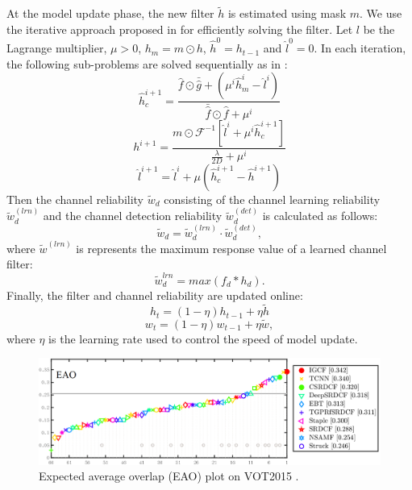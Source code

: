 At the model update phase, the new filter $\tilde{h}$ is estimated using mask $m$. We use the iterative approach proposed in \cite{Lukezic2017DiscriminativeCF} for efficiently solving the filter. Let $l$ be the Lagrange multiplier, $\mu > 0$, $h_m=m \odot h$, $\hat{h}^0 = h_{t-1}$ and $\hat{l}^0 = 0$. In each iteration, the following sub-problems are solved sequentially as in \cite{Lukezic2017DiscriminativeCF}:
\begin{equation} \label{eq:h1}
\hat{h}_c^{i+1} = \frac{\hat{f} \odot \bar{\hat{g}} +(\mu^i \hat{h}_m^i - \hat{l}^i)}{\bar{\hat{f}} \odot \hat f + \mu^i}
\end{equation}
\begin{equation}
h^{i+1} = \frac{m \odot \mathcal{F}^{-1}[\hat{l}^i + \mu^i\hat{h}_c^{i+1}]}{\frac{\lambda}{2D} + \mu^i}
\end{equation}
\begin{equation} \label{eq:h3}
\hat{l}^{i+1} = \hat{l}^i + \mu(\hat{h}_c^{i+1} - \hat{h}^{i+1})
\end{equation}
Then the channel reliability $\tilde w_d$ \cite{Lukezic2017DiscriminativeCF} consisting of the channel learning reliability $\tilde w_d^{(lrn)}$ and the channel detection reliability $\tilde w_d^{(det)}$ is calculated as follows: 
\begin{equation} \label{eq:c}
\tilde w_d = \tilde w_d^{(lrn)} \cdot \tilde w_d^{(det)},
\end{equation}
where $\tilde{w}^{(lrn)}$ is represents the maximum response value of a learned channel filter:
\begin{equation} \label{eq:lrn}
\tilde{w}_d^{lrn} = max(f_d * h_d).
\end{equation}
Finally, the filter and channel reliability are updated online:
\begin{equation} \label{eq:update1}
h_t = (1 - \eta)h_{t-1} + \eta \tilde{h}
\end{equation}
\begin{equation} \label{eq:update2}
w_t = (1-\eta)w_{t-1} + \eta \tilde{w},
\end{equation}
where $\eta$ is the learning rate used to control the speed of model update.

\begin{figure}
    \centering
    \includegraphics[width=1.0\textwidth]{Img/IGCF/vot/eao_rank_vot2015.png}
    \caption{Expected average overlap (EAO) plot on VOT2015 \cite{Kristan2015TheVO}.}
    \label{fig:vot15}
\end{figure}

